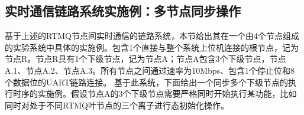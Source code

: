 













\subsection[实时通信链路系统实施例：多节点同步操作]{实时通信链路系统实施例：多节点同步操作}

基于上述的RTMQ节点间实时通信的链路系统，本节给出其在一个由4个节点组成的实验系统中具体的实施例。包含1个直接与整个系统上位机连接的根节点，记为节点R。节点R具有1个下级节点，记为节点A；节点A包含3个下级节点，节点A.1、节点A.2、节点A.3。所有节点之间通过速率为10Mbps、包含1个停止位和8个数据位的UART链路连接。
基于此系统，下面给出一个同步多个下级节点的执行时序的实施例。假设节点A的3个下级节点需要严格同时开始执行某功能，比如同时对处于不同RTMQ叶节点的三个离子进行态初始化操作。

